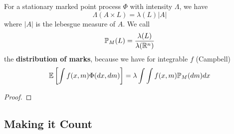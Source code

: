 \begin{lemma}[Campbell]\label{lem: Campbell}
	For a stationary marked point process \(\Phi\) with intensity \(\Lambda\),
	we have	
	\[
		\Lambda(A \times L) = \lambda(L) |A|
	\]
	where \(|A|\) is the lebesgue measure of \(A\). We call
	\[
		\mathbb{P}_M(L) = \frac{\lambda(L)}{\lambda(\mathbb{R}^n)}
	\]
	the \textbf{distribution of marks}, because we have for integrable \(f\)
	(Campbell)
	\[
		\mathbb{E}\left[\int f(x,m) \Phi(dx,dm)\right]
		= \lambda \int \int f(x,m) \mathbb{P}_M(dm) dx
	\]
\end{lemma}
\begin{proof}
\end{proof}

\subsection{Making it Count}

